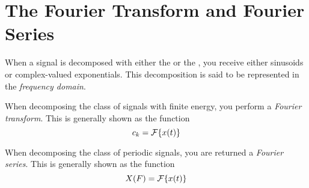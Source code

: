 \section{The Fourier Transform and Fourier Series} \label{sec:Fourier Transform and Series}
When a signal is decomposed with either the  or the , you receive either sinusoids or complex-valued exponentials.
This decomposition is said to be represented in the \emph{frequency domain}.
\begin{definition}\label{def:Fourier Transform}
  When decomposing the class of signals with finite energy, you perform a \emph{Fourier transform}.
  This is generally shown as the function
  \begin{equation*}
    c_{k} = \operatorname{\mathcal{F}} \lbrace x(t) \rbrace
  \end{equation*}
\end{definition}
\begin{definition}\label{def:Fourier Series}
  When decomposing the class of periodic signals, you are returned a \emph{Fourier series}.
  This is generally shown as the function
  \begin{equation*}
    X(F) = \operatorname{\mathcal{F}} \lbrace x(t) \rbrace
  \end{equation*}
\end{definition}
